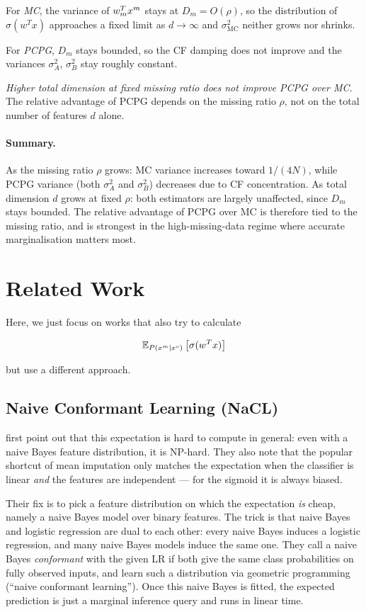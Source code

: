 For \emph{MC}, the variance of $w_m^T x^m$ stays at $D_m = O(\rho)$, so the
distribution of $\sigma(w^T x)$ approaches a fixed limit as $d \to \infty$
and $\sigma^2_{\mathrm{MC}}$ neither grows nor shrinks.

For \emph{PCPG}, $D_m$ stays bounded, so the CF damping does not improve and
the variances $\sigma^2_A$, $\sigma^2_B$ stay roughly constant.

\emph{Higher total dimension at fixed missing ratio does not improve PCPG over MC.}
The relative advantage of PCPG depends on the missing ratio $\rho$, not on
the total number of features $d$ alone.

\paragraph{Summary.}
As the missing ratio $\rho$ grows: MC variance increases toward $1/(4N)$, while
PCPG variance (both $\sigma^2_A$ and $\sigma^2_B$) decreases due to CF
concentration.
As total dimension $d$ grows at fixed $\rho$: both estimators are largely
unaffected, since $D_m$ stays bounded.
The relative advantage of PCPG over MC is therefore tied to the missing ratio,
and is strongest in the high-missing-data regime where accurate marginalisation
matters most.

\section{Related Work}

Here, we just focus on works that also try to calculate 

\[
  \mathbb{E}_{P(x^m \mid x^o)} \left[\sigma(w^T x)\right]
\]

but use a different approach.

\subsection{Naive Conformant Learning (NaCL)}

\citet{khosravi2019expect} first point out that this expectation is hard
to compute in general: even with a naive Bayes feature distribution, it
is NP-hard. They also note that the popular shortcut of mean imputation
only matches the expectation when the classifier is linear \emph{and} the
features are independent --- for the sigmoid it is always biased.

Their fix is to pick a feature distribution on which the expectation
\emph{is} cheap, namely a naive Bayes model over binary features. The
trick is that naive Bayes and logistic regression are dual to each other:
every naive Bayes induces a logistic regression, and many naive Bayes
models induce the same one. They call a naive Bayes \textit{conformant}
with the given LR if both give the same class probabilities on fully
observed inputs, and learn such a distribution via geometric programming
(``naive conformant learning''). Once this naive Bayes is fitted, the
expected prediction is just a marginal inference query and runs in linear
time.

